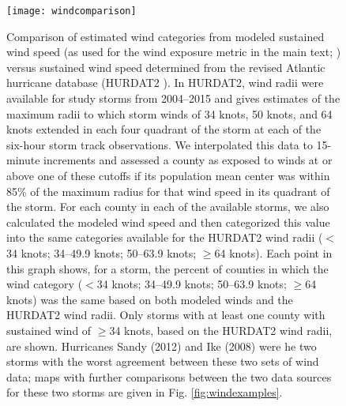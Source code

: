 \documentclass[11pt, titlepage]{article}
\begin{document}
\clearpage

\begin{figure}[tbhp!]
\centering
\texttt{[image: windcomparison]}
\caption{Comparison of estimated wind categories from modeled sustained wind speed (as used for the wind exposure metric in the main text; \citep{stormwindmodel}) versus sustained wind speed determined from the revised Atlantic hurricane database (HURDAT2 \citep{landsea2013}). In HURDAT2, wind radii were available for study storms from 2004--2015 and gives estimates of the maximum radii to which storm winds of 34 knots, 50 knots, and 64 knots extended in each four quadrant of the storm at each of the six-hour storm track observations. We interpolated this data to 15-minute increments and assessed a county as exposed to winds at or above one of these cutoffs if its population mean center was within 85\% of the maximum radius for that wind speed in its quadrant of the storm. For each county in each of the available storms, we also calculated the modeled wind speed \citep{stormwindmodel} and then categorized this value into the same categories available for the HURDAT2 wind radii ($<$34 knots; 34--49.9 knots; 50--63.9 knots; $\ge$64 knots). Each point in this graph shows, for a storm, the percent of counties in which the wind category ($<$34 knots; 34--49.9 knots; 50--63.9 knots; $\ge$64 knots) was the same based on both modeled winds and the HURDAT2 wind radii. Only storms with at least one county with sustained wind of $\ge$34 knots, based on the HURDAT2 wind radii, are shown. Hurricanes Sandy (2012) and Ike (2008) were he two storms with the worst agreement between these two sets of wind data; maps with further comparisons between the two data sources for these two storms are given in Fig. \ref{fig:windexamples}.}
\label{fig:windcomparison}
\end{figure}
\end{document}
